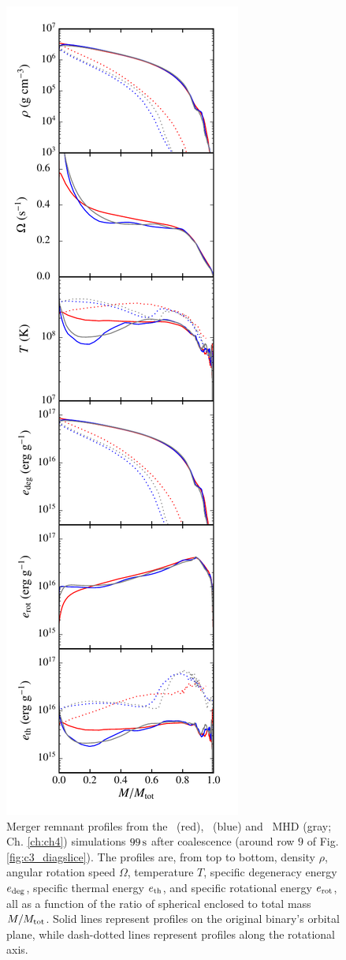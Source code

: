 \begin{figure}
\centering
\includegraphics[angle=0,width=0.35\columnwidth]{chapter3_zhu+u/figures/curves.pdf}
\caption{Merger remnant profiles from the \gasoline\ (red), \arepo\ (blue) and \arepo\ MHD (gray; Ch. \ref{ch:ch4}) simulations $99\,\mathrm{s}$ after coalescence (around row $9$ of Fig. \ref{fig:c3_diagslice}).  The profiles are, from top to bottom, density $\rho$, angular rotation speed $\Omega$, temperature $T$, specific degeneracy energy  $e_{\rm deg}$, specific thermal energy $e_{\rm th}$, and specific rotational energy $e_{\rm rot}$, all as a function of the ratio of spherical enclosed to total mass $M/M_{\rm tot}$.  Solid lines represent profiles on the original binary's orbital plane, while dash-dotted lines represent profiles along the rotational axis.}
\label{fig:c3_curves}
\end{figure}

